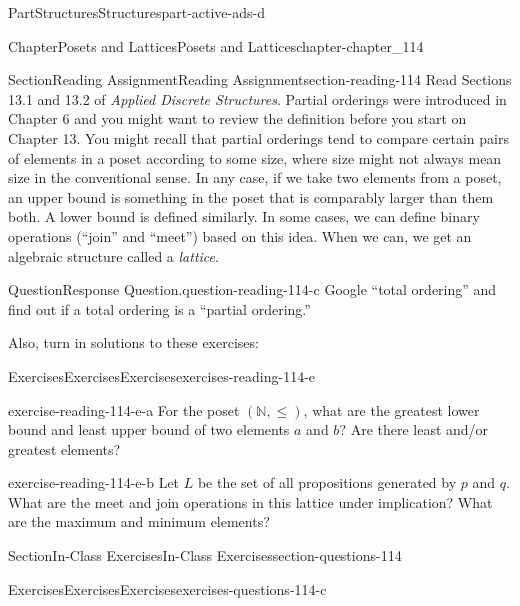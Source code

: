 \documentclass[oneside,10pt,]{book}
\numberwithin{equation}{section}
\begin{document}
\begin{partptx}{Part}{Structures}{}{Structures}{}{}{part-active-ads-d}
\begin{chapterptx}{Chapter}{Posets and Lattices}{}{Posets and Lattices}{}{}{chapter-chapter_114}
\begin{sectionptx}{Section}{Reading Assignment}{}{Reading Assignment}{}{}{section-reading-114}
Read Sections 13.1 and 13.2 of \emph{Applied Discrete Structures}. Partial orderings were introduced in Chapter 6 and you might want to review the definition before you start on Chapter 13. You might recall that partial orderings tend to compare certain pairs of elements in a poset according to some size, where size might not always mean size in the conventional sense.  In any case, if we take two elements from a poset, an upper bound is something in the poset that is comparably larger than them both.  A lower bound is defined similarly. In some cases, we can define binary operations (``join'' and ``meet'') based on this idea.  When we can, we get an algebraic structure called a \emph{lattice}.%
\begin{question}{Question}{Response Question.}{question-reading-114-c}%
Google “total ordering” and find out if a total ordering is a “partial ordering.”%
\end{question}
Also, turn in solutions to these exercises:%
%
%
\typeout{************************************************}
\typeout{************************************************}
%
\begin{exercises-subsection-numberless}{Exercises}{Exercises}{}{Exercises}{}{}{exercises-reading-114-e}
\begin{divisionexercise}{1}{}{}{exercise-reading-114-e-a}%
For the poset \((\mathbb{N},\leq )\), what are the greatest lower bound and least upper bound of two elements \(a\) and \(b\)? Are there least and\slash{}or greatest elements?%
\end{divisionexercise}%
\begin{divisionexercise}{2}{}{}{exercise-reading-114-e-b}%
Let \(L\) be the set of all propositions generated by \(p\) and \(q\).  What are the meet and join operations in this lattice under implication?   What are the maximum and minimum elements?%
\end{divisionexercise}%
\end{exercises-subsection-numberless}
\end{sectionptx}
%
%
\typeout{************************************************}
\typeout{************************************************}
%
\begin{sectionptx}{Section}{In-Class Exercises}{}{In-Class Exercises}{}{}{section-questions-114}
%
%
%
\typeout{************************************************}
\typeout{************************************************}
%
\begin{exercises-subsection-numberless}{Exercises}{Exercises}{}{Exercises}{}{}{exercises-questions-114-c}

\end{exercises-subsection-numberless}
\end{sectionptx}
\end{chapterptx}
\end{partptx}
\end{document}
